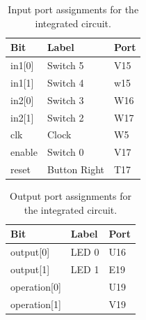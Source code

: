 \documentclass[11pt]{article}
\begin{document}
\begin{table}[H]
\begin{center}
\begin{tabular}{| l | l | l |}
	\hline
	Bit & Label & Port \\ \hline
	in1[0] &  Switch 5 & V15 \\ \hline
	in1[1] & Switch 4 & w15 \\ \hline
	in2[0] & Switch 3 & W16 \\ \hline
	in2[1] & Switch 2 & W17 \\ \hline
	clk &  Clock & W5 \\ \hline
	enable & Switch 0 & V17 \\ \hline
	reset & Button Right & T17 \\ \hline
\end{tabular}
\caption{\label{tab:integration_input_Ports}Input port assignments for  the integrated circuit.}
\end{center}
\end{table}

\begin{table}[H]
\begin{center}
\begin{tabular}{| l | l | l |}
	\hline
	Bit & Label & Port \\ \hline
	output[0] & LED 0 & U16 \\ \hline
	output[1] & LED 1 & E19 \\ \hline
	operation[0] & & U19 \\ \hline
	operation[1] & & V19 \\ \hline
\end{tabular}
\caption{\label{tab:integration_output_Ports}Output port assignments for the integrated circuit.}
\end{center}
\end{table}
\end{document}
